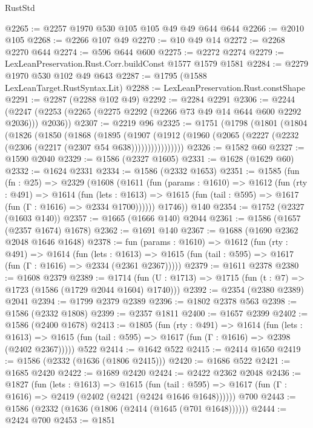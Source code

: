 \begin{lexlean}{RustStd}
\begin{coremodule}
@2265 := @2257 @1970 @530 @105 @105 @49 @49 @644 @644
@2266 := @2010 @105
@2268 := @2266 @107 @49
@2270 := @10 @49 @14
@2272 := @2268 @2270 @644
@2274 := @596 @644 @600
@2275 := @2272 @2274
@2279 := LexLeanPreservation.Rust.Corr.buildConst @1577 @1579 @1581
@2284 := @2279 @1970 @530 @102 @49 @643
@2287 := @1795 (@1588 LexLeanTarget.RustSyntax.Lit)
@2288 := LexLeanPreservation.Rust.constShape
@2291 := @2287 (@2288 @102 @49)
@2292 := @2284 @2291
@2306 := @2244 (@2247 (@2253 (@2265 (@2275 @2292 (@2266 @73 @49 @14 @644 @600 @2292 @2036))) @2036))
@2307 := @2219 @96
@2325 := @1751
    (@1798
      (@1801
        (@1804
          (@1826
            (@1850
              (@1868
                (@1895
                  (@1907
                    (@1912 (@1960 (@2065 (@2227 (@2232 (@2306 (@2217 (@2307 @54 @638))))))))))))))))
@2326 := @1582 @60
@2327 := @1590 @2040
@2329 := @1586 (@2327 @1605)
@2331 := @1628 (@1629 @60)
@2332 := @1624 @2331
@2334 := @1586 (@2332 @1653)
@2351 := @1585
    (fun (fn : @25) =>
    @2329
      (@1608
        (@1611
          (fun (params : @1610) =>
          @1612
            (fun (rty : @491) =>
            @1614
              (fun (lets : @1613) =>
              @1615 (fun (tail : @595) => @1617 (fun (Γ : @1616) => @2334 @1700))))))
        @1746))
    @140
@2354 := @1752 (@2327 (@1603 @140))
@2357 := @1665 (@1666 @140) @2044
@2361 := @1586 (@1657 (@2357 @1674) @1678)
@2362 := @1691 @140
@2367 := @1688 (@1690 @2362 @2048 @1646 @1648)
@2378 := fun (params : @1610) =>
  @1612
    (fun (rty : @491) =>
    @1614
      (fun (lets : @1613) =>
      @1615 (fun (tail : @595) => @1617 (fun (Γ : @1616) => @2334 (@2361 @2367)))))
@2379 := @1611 @2378
@2380 := @1608 @2379
@2389 := @1714 (fun (U : @1713) => @1715 (fun (t : @7) => @1723 (@1586 (@1729 @2044 @1604) @1740)))
@2392 := @2354 (@2380 @2389) @2041
@2394 := @1799 @2379 @2389
@2396 := @1802 @2378 @563
@2398 := @1586 (@2332 @1808)
@2399 := @2357 @1811
@2400 := @1657 @2399
@2402 := @1586 (@2400 @1678)
@2413 := @1805
    (fun (rty : @491) =>
    @1614
      (fun (lets : @1613) =>
      @1615 (fun (tail : @595) => @1617 (fun (Γ : @1616) => @2398 (@2402 @2367)))))
    @522
@2414 := @1642 @522
@2415 := @2414 @1650
@2419 := @1586 (@2332 (@1636 (@1806 @2415)))
@2420 := @1686 @522
@2421 := @1685 @2420
@2422 := @1689 @2420
@2424 := @2422 @2362 @2048
@2436 := @1827
    (fun (lets : @1613) =>
    @1615
      (fun (tail : @595) => @1617 (fun (Γ : @1616) => @2419 (@2402 (@2421 (@2424 @1646 @1648))))))
    @700
@2443 := @1586 (@2332 (@1636 (@1806 (@2414 (@1645 (@701 @1648))))))
@2444 := @2424 @700
@2453 := @1851

\end{coremodule}
\end{lexlean}
